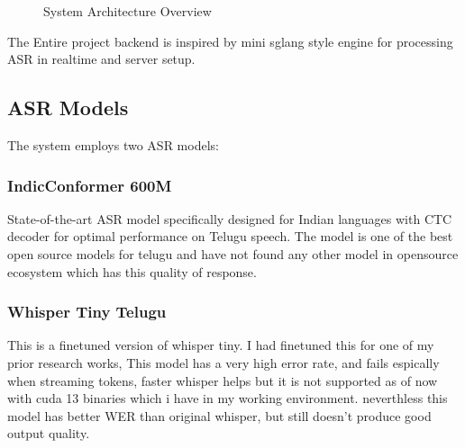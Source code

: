 \documentclass[11pt,a4paper]{article}
\begin{document}
\begin{figure}[h]
\centering
{}
\caption{System Architecture Overview}
\label{fig:architecture}
\end{figure}
The Entire project backend is inspired by mini sglang style engine for processing ASR in realtime and server setup.

\subsection{ASR Models}

The system employs two ASR models:

\subsubsection{IndicConformer 600M}
State-of-the-art ASR model specifically designed for Indian languages with CTC decoder for optimal performance on Telugu speech. The model is one of the best open source models for telugu and have not found any other model in opensource ecosystem which has this quality of response.

\subsubsection{Whisper Tiny Telugu}
This is a finetuned version of whisper tiny. I had finetuned this for one of my prior research works, This model has a very high error rate, and fails espically when streaming tokens, faster whisper helps but it is not supported as of now with cuda 13 binaries which i have in my working environment. neverthless this model has better WER than original whisper, but still doesn't produce good output quality.
\end{document}
